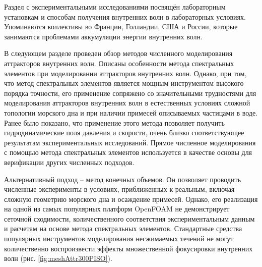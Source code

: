 \documentclass[utf8x]{G7-32} %
\begin{document}
Раздел с экспериментальными исследованиями посвящён лабораторным установкам и способам получения внутренних волн в лабораторных условиях. Упоминаются коллективы во Франции, Голландии, США и России, которые занимаются проблемами аккумуляции энергии внутренних волн.

В следующем разделе проведен обзор методов численного моделирования аттракторов внутренних волн. Описаны особенности метода спектральных элементов при моделировании аттракторов внутренних волн. Однако, при том, что метод спектральных элементов является мощным инструментом высокого порядка точности, его применение сопряжено со значительными трудностями для моделирования аттракторов внутренних волн в естественных условиях сложной топологии морского дна и при наличии примесей описываемых частицами в воде. Ранее было показано, что применение этого метода позволяет получить гидродинамические поля давления и скорости, очень близко соответствующее результатам экспериментальных исследований. Прямое численное моделирования с помощью метода спектральных элементов используется в качестве основы для верификации других численных подходов.

Альтернативный подход -- метод конечных объемов. Он позволяет проводить численные эксперименты в условиях, приближенных к реальным, включая сложную геометрию морского дна и осаждение примесей. Однако, его реализация на одной из самых популярных платформ OpenFOAM не демонстрирует сеточной сходимости, количественного соответствия экспериментальным данным и расчетам на основе метода спектральных элементов. 
Стандартные средства популярных инструментов моделирования несжимаемых течений не могут количественно воспроизвести эффекты множественной фокусировки внутренних волн (рис. \ref{fig:meshAttr300PISO}).
\end{document}
